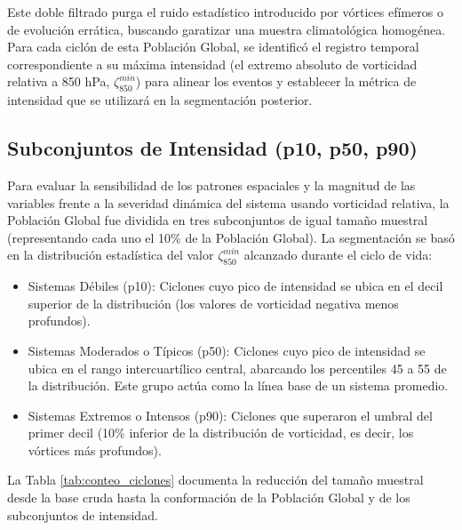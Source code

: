 Este doble filtrado purga el ruido estadístico introducido por vórtices efímeros o de evolución errática, buscando garatizar una muestra climatológica homogénea. Para cada ciclón de esta Población Global, se identificó el registro temporal correspondiente a su máxima intensidad (el extremo absoluto de vorticidad relativa a 850 hPa, $\zeta_{850}^{min}$) para alinear los eventos y establecer la métrica de intensidad que se utilizará en la segmentación posterior. 

\subsection{Subconjuntos de Intensidad (p10, p50, p90)}\label{subsec:subconjuntos_intensidad}

Para evaluar la sensibilidad de los patrones espaciales y la magnitud de las variables frente a la severidad dinámica del sistema usando vorticidad relativa, la Población Global fue dividida en tres subconjuntos de igual tamaño muestral (representando cada uno el 10\% de la Población Global). La segmentación se basó en la distribución estadística del valor $\zeta_{850}^{min}$ alcanzado durante el ciclo de vida:

\begin{itemize}
    \item Sistemas Débiles (p10): Ciclones cuyo pico de intensidad se ubica en el decil superior de la distribución (los valores de vorticidad negativa menos profundos).
    \item Sistemas Moderados o Típicos (p50): Ciclones cuyo pico de intensidad se ubica en el rango intercuartílico central, abarcando los percentiles 45 a 55 de la distribución. Este grupo actúa como la línea base de un sistema promedio.
    \item Sistemas Extremos o Intensos (p90): Ciclones que superaron el umbral del primer decil (10\% inferior de la distribución de vorticidad, es decir, los vórtices más profundos).
\end{itemize}

La Tabla \ref{tab:conteo_ciclones} documenta la reducción del tamaño muestral desde la base cruda hasta la conformación de la Población Global y de los subconjuntos de intensidad.




